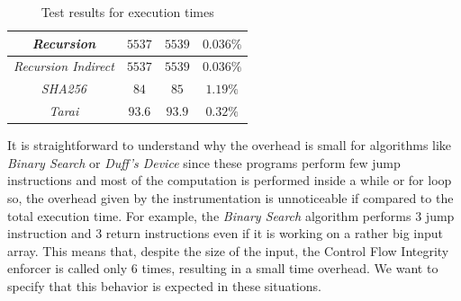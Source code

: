 \begin{table}
\begin{tabular}{|c|c|c|c|}
    \hline
    \textit{Recursion}                   & $5537$                        & $5539$                        & $0.036\%$              \\
    \hline
    \textit{Recursion Indirect}          & $5537$                        & $5539$                        & $0.036\%$              \\
    \hline
    \textit{SHA256}                      & $84$                          & $85$                          & $1.19\%$               \\
    \hline
    \textit{Tarai}                       & $93.6$                        & $93.9$                        & $0.32\%$               \\
    \hline
  \end{tabular}
  \caption{Test results for execution times}
  \label{tab:times}
\end{table}

It is straightforward to understand why the overhead is small for algorithms like
\textit{Binary Search} or \textit{Duff's Device} since these programs perform few
jump instructions and most of the computation is performed inside a while or for
loop so, the overhead given by the instrumentation is unnoticeable if compared
to the total execution time. For example, the \textit{Binary Search} algorithm performs
$3$ jump instruction and $3$ return instructions even if it is working on a rather
big input array. This means that, despite the size of the input, the Control
Flow Integrity enforcer is called only $6$ times, resulting in a small time overhead.
We want to specify that this behavior is expected in these situations.

